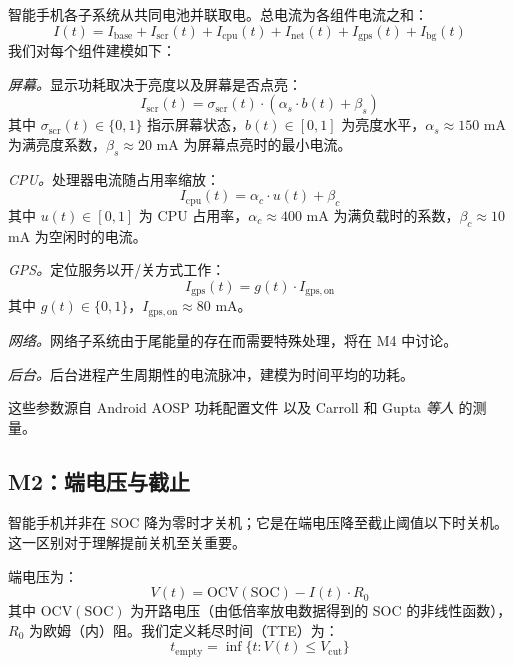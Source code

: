 \documentclass[11pt,a4paper]{ctexart}
\begin{document}
智能手机各子系统从共同电池并联取电。总电流为各组件电流之和：
\begin{equation}
I(t) = I_{\mathrm{base}} + I_{\mathrm{scr}}(t) + I_{\mathrm{cpu}}(t) + I_{\mathrm{net}}(t) + I_{\mathrm{gps}}(t) + I_{\mathrm{bg}}(t)
\end{equation}
我们对每个组件建模如下：

\textit{屏幕。}显示功耗取决于亮度以及屏幕是否点亮：
\begin{equation}
I_{\mathrm{scr}}(t) = \sigma_{\mathrm{scr}}(t)\cdot\left(\alpha_s\cdot b(t) + \beta_s\right)
\end{equation}
其中 $\sigma_{\mathrm{scr}}(t)\in\{0,1\}$ 指示屏幕状态，$b(t)\in[0,1]$ 为亮度水平，$\alpha_s \approx 150$ mA 为满亮度系数，$\beta_s \approx 20$ mA 为屏幕点亮时的最小电流。

\textit{CPU。}处理器电流随占用率缩放：
\begin{equation}
I_{\mathrm{cpu}}(t) = \alpha_c\cdot u(t) + \beta_c
\end{equation}
其中 $u(t)\in[0,1]$ 为 CPU 占用率，$\alpha_c \approx 400$ mA 为满负载时的系数，$\beta_c \approx 10$ mA 为空闲时的电流。

\textit{GPS。}定位服务以开/关方式工作：
\begin{equation}
I_{\mathrm{gps}}(t) = g(t)\cdot I_{\mathrm{gps,on}}
\end{equation}
其中 $g(t)\in\{0,1\}$，$I_{\mathrm{gps,on}} \approx 80$ mA。

\textit{网络。}网络子系统由于尾能量的存在而需要特殊处理，将在 M4 中讨论。

\textit{后台。}后台进程产生周期性的电流脉冲，建模为时间平均的功耗。

这些参数源自 Android AOSP 功耗配置文件 \cite{ref5} 以及 Carroll \cite{ref7} 和 Gupta \textit{等人} \cite{ref2} 的测量。

\subsection{M2：端电压与截止}

智能手机并非在 SOC 降为零时才关机；它是在端电压降至截止阈值以下时关机。这一区别对于理解提前关机至关重要。

端电压为：
\begin{equation}
V(t) = \mathrm{OCV}(\mathrm{SOC}) - I(t)\cdot R_0
\end{equation}
其中 $\mathrm{OCV}(\mathrm{SOC})$ 为开路电压（由低倍率放电数据得到的 SOC 的非线性函数），$R_0$ 为欧姆（内）阻。我们定义耗尽时间（TTE）为：
\begin{equation}
t_{\mathrm{empty}} = \inf\{t: V(t)\le V_{\mathrm{cut}}\}
\end{equation}
\end{document}
